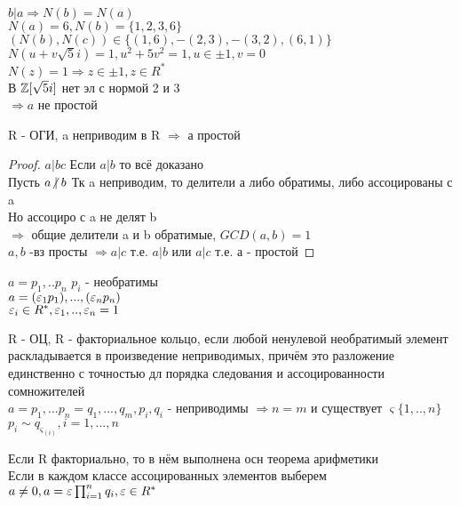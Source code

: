 $ b | a \Rightarrow N(b) = N(a) $ \\
$ N(a) = 6, N(b) = \{1,2,3,6\} $ \\
$ (N(b), N(c)) \in \{ (1,6), -(2,3), -(3,2), (6,1) \} $ \\
$ N(u + v\sqrt{5}i) = 1, u^2 + 5v^2 = 1, u \in \pm 1, v = 0 $ \\
$ N(z) = 1 \Rightarrow z \in \pm 1, z \in R^* $ \\
В $ \mathbb{Z}[\sqrt{5} i] $ нет эл с нормой 2 и 3 \\
$ \Rightarrow a $ не простой \\
\begin{theorem}
	R - ОГИ, a неприводим в R $ \Rightarrow $ а простой \\
	\begin{proof}
		$ a | bc $ Если $ a | b $ то всё доказано \\
		Пусть $ a \centernot| b $ Тк a неприводим, то делители а либо обратимы, либо ассоцированы с a \\
		Но ассоциро с a не делят b \\
		$ \Rightarrow $ общие делители a и b обратимые, $ GCD(a,b) = 1 $\\
		$ a,b $ -вз просты $ \Rightarrow a | c $ т.е. $ a|b $ или $ a | c$ т.е. а - простой
	\end{proof}
\end{theorem}


$ a = p_1,..p_n$ $ p_i$ - необратимы \\
$ a = (\varepsilon_1p_1), ..., (\varepsilon_np_n) $ \\
$ \varepsilon_i \in R^*, \varepsilon_1,.., \varepsilon_n = 1 $\\
\begin{definition}
	R - ОЦ, R - факториальное кольцо, если любой ненулевой необратимый элемент раскладывается в произведение неприводимых, причём это разложение единственно с точностью дл порядка следования и ассоцированности сомножителей \\
	$ a = p_1, ... p_n = q_1,...,q_m , p_i, q_i $ - неприводимы $ \Rightarrow n = m $ и существует $ \varsigma \{1,..,n\} $ \\
	$ p_i \sim q_{\varsigma_{(i)}} , i = 1,...,n $
\end{definition}
Если R факториально, то в нём выполнена осн теорема арифметики \\
Если в каждом классе ассоцированных элементов выберем  
$ a \neq 0, a = \varepsilon \prod_{i=1}^{n} q_i, \varepsilon \in R^* $ 


